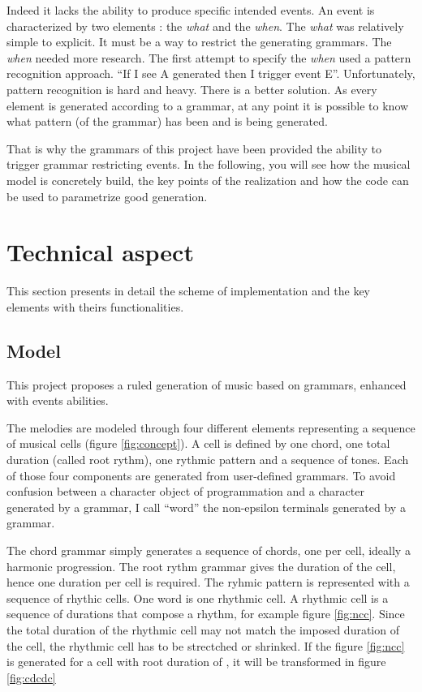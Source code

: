 \documentclass[twocolumn, 11pt]{article}
\begin{document}
Indeed it lacks the ability to produce specific intended events. An event is characterized by two elements : the \emph{what} and the \emph{when}. The \emph{what} was relatively simple to explicit. It must be a way to restrict the generating grammars. The \emph{when} needed more research. The first attempt to specify the \emph{when} used a pattern recognition approach. ``If I see A generated then I trigger event E''. Unfortunately, pattern recognition is hard and heavy. There is a better solution. As every element is generated according to a grammar, at any point it is possible to know what pattern (of the grammar) has been and is being generated.

That is why the grammars of this project have been provided the ability to trigger grammar restricting events. In the following, you will see how the musical model is concretely build, the key points of the realization and how the code can be used to parametrize good generation.



\section{Technical aspect}
This section presents in detail the scheme of implementation and the key elements with theirs functionalities.


\subsection{Model}


This project proposes a ruled generation of music based on grammars, enhanced with events abilities.

The melodies are modeled through four different elements representing a sequence of musical cells (figure \ref{fig:concept}).
A cell is defined by one chord, one total duration (called root rythm), one rythmic pattern and a sequence of tones.
Each of those four components are generated from user-defined grammars. To avoid confusion between a character object of programmation and a character generated by a grammar, I call ``word'' the non-epsilon terminals generated by a grammar.

The chord grammar simply generates a sequence of chords, one per cell, ideally a harmonic progression.
The root rythm grammar gives the duration of the cell, hence one duration per cell is required.
The ryhmic pattern is represented with a sequence of rhythic cells. One word is one rhythmic cell. A rhythmic cell is a sequence of durations that compose a rhythm, for example figure \ref{fig:ncc}. Since the total duration of the rhythmic cell may not match the imposed duration of the cell, the rhythmic cell has to be strectched or shrinked. If the figure \ref{fig:ncc} is generated for a cell with root duration of \quarternote, it will be transformed in figure \ref{fig:cdcdc}
\end{document}
